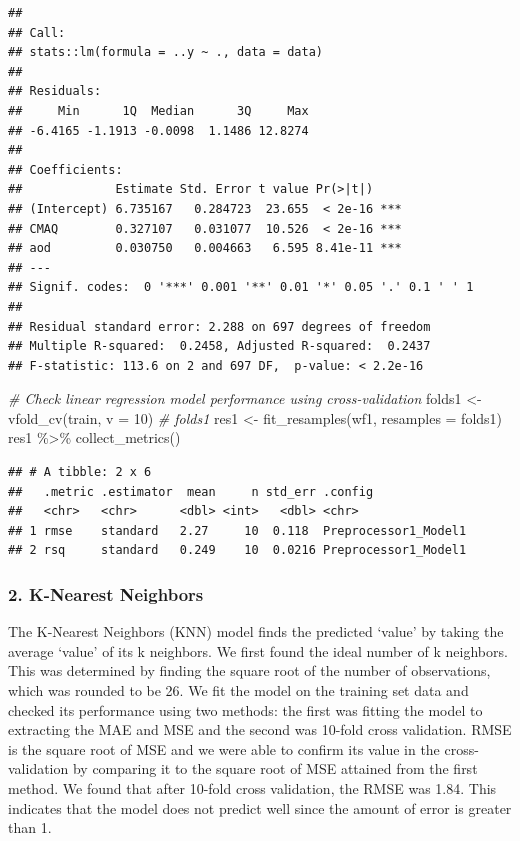 \documentclass[
]{article}
\newenvironment{Shaded}{\begin{snugshade}}{\end{snugshade}}
\newcommand{\AttributeTok}[1]{\textcolor[rgb]{0.77,0.63,0.00}{#1}}
\newcommand{\CommentTok}[1]{\textcolor[rgb]{0.56,0.35,0.01}{\textit{#1}}}
\newcommand{\DecValTok}[1]{\textcolor[rgb]{0.00,0.00,0.81}{#1}}
\newcommand{\FunctionTok}[1]{\textcolor[rgb]{0.00,0.00,0.00}{#1}}
\newcommand{\NormalTok}[1]{#1}
\newcommand{\OtherTok}[1]{\textcolor[rgb]{0.56,0.35,0.01}{#1}}
\newcommand{\SpecialCharTok}[1]{\textcolor[rgb]{0.00,0.00,0.00}{#1}}
\begin{document}
\begin{verbatim}
## 
## Call:
## stats::lm(formula = ..y ~ ., data = data)
## 
## Residuals:
##     Min      1Q  Median      3Q     Max 
## -6.4165 -1.1913 -0.0098  1.1486 12.8274 
## 
## Coefficients:
##             Estimate Std. Error t value Pr(>|t|)    
## (Intercept) 6.735167   0.284723  23.655  < 2e-16 ***
## CMAQ        0.327107   0.031077  10.526  < 2e-16 ***
## aod         0.030750   0.004663   6.595 8.41e-11 ***
## ---
## Signif. codes:  0 '***' 0.001 '**' 0.01 '*' 0.05 '.' 0.1 ' ' 1
## 
## Residual standard error: 2.288 on 697 degrees of freedom
## Multiple R-squared:  0.2458, Adjusted R-squared:  0.2437 
## F-statistic: 113.6 on 2 and 697 DF,  p-value: < 2.2e-16
\end{verbatim}

\begin{Shaded}
\begin{Highlighting}[]
\CommentTok{\# Check linear regression model performance using cross{-}validation}
\NormalTok{folds1 }\OtherTok{\textless{}{-}} \FunctionTok{vfold\_cv}\NormalTok{(train, }\AttributeTok{v =} \DecValTok{10}\NormalTok{)}
\CommentTok{\# folds1}
\NormalTok{res1 }\OtherTok{\textless{}{-}} \FunctionTok{fit\_resamples}\NormalTok{(wf1, }\AttributeTok{resamples =}\NormalTok{ folds1)}
\NormalTok{res1 }\SpecialCharTok{\%\textgreater{}\%} 
    \FunctionTok{collect\_metrics}\NormalTok{()}
\end{Highlighting}
\end{Shaded}

\begin{verbatim}
## # A tibble: 2 x 6
##   .metric .estimator  mean     n std_err .config             
##   <chr>   <chr>      <dbl> <int>   <dbl> <chr>               
## 1 rmse    standard   2.27     10  0.118  Preprocessor1_Model1
## 2 rsq     standard   0.249    10  0.0216 Preprocessor1_Model1
\end{verbatim}

\hypertarget{k-nearest-neighbors}{%
\subsubsection{2. K-Nearest Neighbors}\label{k-nearest-neighbors}}

The K-Nearest Neighbors (KNN) model finds the predicted `value' by
taking the average `value' of its k neighbors. We first found the ideal
number of k neighbors. This was determined by finding the square root of
the number of observations, which was rounded to be 26. We fit the model
on the training set data and checked its performance using two methods:
the first was fitting the model to extracting the MAE and MSE and the
second was 10-fold cross validation. RMSE is the square root of MSE and
we were able to confirm its value in the cross-validation by comparing
it to the square root of MSE attained from the first method. We found
that after 10-fold cross validation, the RMSE was 1.84. This indicates
that the model does not predict well since the amount of error is
greater than 1.
\end{document}
